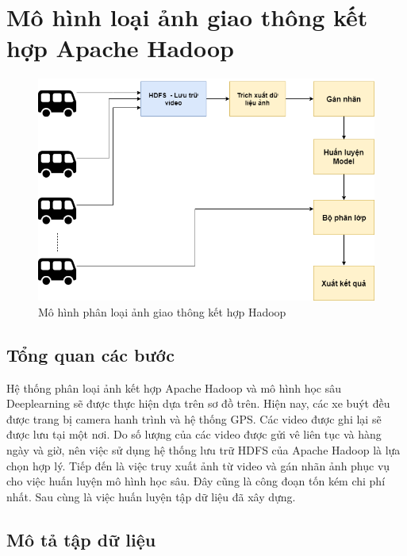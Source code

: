\chapter{Mô hình loại ảnh giao thông kết hợp Apache Hadoop}

\begin{figure}[h!]
		\centering
		\includegraphics[scale=0.5]{charts/usecase.png}
		\caption{Mô hình phân loại ảnh giao thông kết hợp Hadoop}
		\label{fig:usecase}
	\end{figure}

\section{Tổng quan các bước}
	Hệ thống phân loại ảnh kết hợp Apache Hadoop và mô hình học sâu Deeplearning sẽ được thực hiện dựa trên sơ đồ trên. Hiện nay, các xe buýt đều được trang bị camera hanh trình và hệ thống GPS. Các video được ghi lại sẽ được lưu tại một nơi. Do số lượng của các video được gửi vê liên tục và hàng ngày và giờ, nên việc sử dụng hệ thống lưu trữ HDFS của Apache Hadoop là lựa chọn hợp lý. Tiếp đến là việc truy xuất ảnh từ video và gán nhãn ảnh phục vụ cho việc huấn luyện mô hình học sâu. Đây cũng là công đoạn tốn kém chi phí nhất. Sau cùng là việc huấn luyện tập dữ liệu đã xây dựng.
	
\section{Mô tả tập dữ liệu}
	
